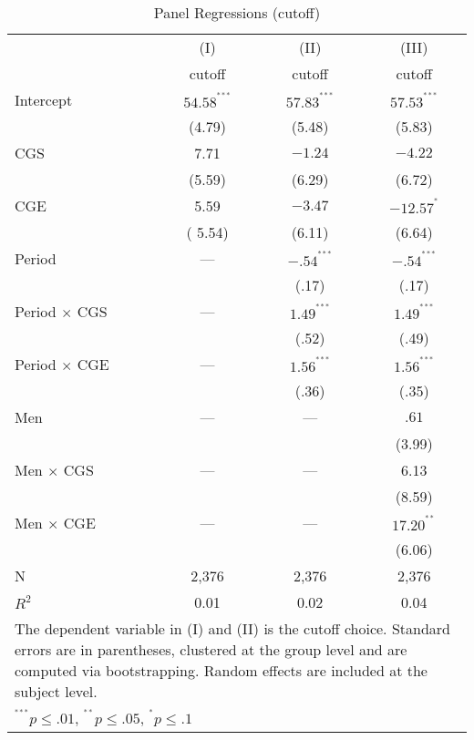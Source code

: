 \documentclass[12pt, letterpaper]{article}
\theoremstyle{plain}
\begin{document}
\begin{table}[ht]
\centering
\caption{Panel Regressions (cutoff)}
\footnotesize
\begin{tabular}{lccc}

  & (I) & (II) & (III) \\
&  cutoff & cutoff & cutoff   \\
    \hline
Intercept & $54.58^{^{***}}$ & $57.83^{^{***}}$ &  $ 57.53^{^{***}}$ \\
& (4.79) & (5.48) & (5.83) \\
CGS &  7.71 & $-1.24$ &  $-4.22$  \\
& (5.59) & (6.29) & (6.72) \\
CGE &  5.59 & $-3.47$ &  $-12.57^{^{*}}$ \\
& ( 5.54) &  (6.11) & (6.64) \\
Period & ---& $-.54^{^{***}}$ & $-.54^{^{***}}$ \\
& & (.17)&  (.17) \\
Period $\times$ CGS & ---& $1.49^{^{***}}$& $ 1.49^{^{***}}$ \\
& & (.52) & (.49)  \\
Period $\times$ CGE & ---& $1.56^{^{***}}$& $1.56^{^{***}}$\\
& & (.36) & (.35) \\
Men & --- &  --- & $.61$  \\
& &  & (3.99) \\
Men $\times$ CGS & ---& --- &  6.13 \\
& & & (8.59) \\
Men $\times$ CGE & ---& --- & $17.20^{^{**}}$ \\
& & & (6.06)\\

\hline
N & 2,376 & 2,376 & 2,376 \\ 
$R^2$ & 0.01 & 0.02 & 0.04 \\
\hline
\hline
 \multicolumn{4}{p{.45\textwidth}}{\scriptsize{The dependent variable in (I) and (II) is the cutoff choice. Standard errors are in parentheses, clustered at the group level and are computed via bootstrapping. Random effects are included at the subject level.}}\\ 
 \multicolumn{4}{p{0.4\textwidth}}{\scriptsize{ $^{^{***}}p\leq.01$,
    $^{^{**}}p\leq.05$, $^{^{*}}p\leq.1$}} \\
\end{tabular}
\label{table:ols_cutoff}
\end{table}
\end{document}
